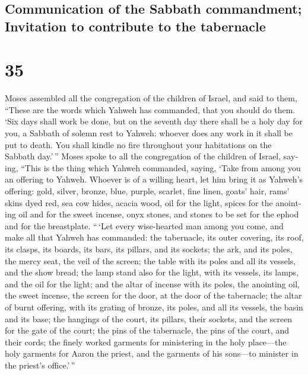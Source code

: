 \begin{paracol}{2}
\switchcolumn
\begin{otherlanguage}{english}

\hypertarget{communication-of-the-sabbath-commandment-invitation-to-contribute-to-the-tabernacle}{%
\subsection{Communication of the Sabbath commandment; Invitation to
contribute to the
tabernacle}\label{communication-of-the-sabbath-commandment-invitation-to-contribute-to-the-tabernacle}}

\hypertarget{section-69}{%
\section{35}\label{section-69}}

 Moses assembled all the congregation of the children of
Israel, and said to them, ``These are the words which Yahweh has
commanded, that you should do them.  `Six days shall work
be done, but on the seventh day there shall be a holy day for you, a
Sabbath of solemn rest to Yahweh: whoever does any work in it shall be
put to death.  You shall kindle no fire throughout your
habitations on the Sabbath day.'\,''  Moses spoke to all
the congregation of the children of Israel, saying, ``This is the thing
which Yahweh commanded, saying,  `Take from among you an
offering to Yahweh. Whoever is of a willing heart, let him bring it as
Yahweh's offering: gold, silver, bronze,  blue, purple,
scarlet, fine linen, goats' hair,  rams' skins dyed red,
sea cow hides, acacia wood,  oil for the light, spices for
the anointing oil and for the sweet incense,  onyx stones,
and stones to be set for the ephod and for the breastplate.
 ``\,`Let every wise-hearted man among you come, and make
all that Yahweh has commanded:  the tabernacle, its outer
covering, its roof, its clasps, its boards, its bars, its pillars, and
its sockets;  the ark, and its poles, the mercy seat, the
veil of the screen;  the table with its poles and all its
vessels, and the show bread;  the lamp stand also for the
light, with its vessels, its lamps, and the oil for the light;
 and the altar of incense with its poles, the anointing
oil, the sweet incense, the screen for the door, at the door of the
tabernacle;  the altar of burnt offering, with its
grating of bronze, its poles, and all its vessels, the basin and its
base;  the hangings of the court, its pillars, their
sockets, and the screen for the gate of the court;  the
pins of the tabernacle, the pins of the court, and their cords;
 the finely worked garments for ministering in the holy
place---the holy garments for Aaron the priest, and the garments of his
sons---to minister in the priest's office.'\,''


\end{otherlanguage}
\end{paracol}
